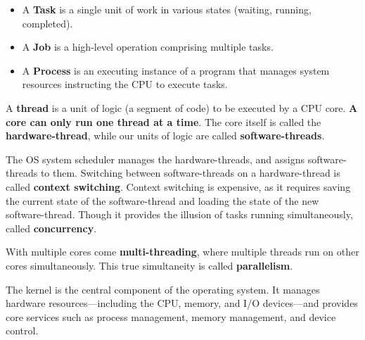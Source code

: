 \begin{Def}

    \begin{itemize}
        \item A \textbf{Task} is a single unit of work in various states (waiting, running, completed).
        \item A \textbf{Job} is a high-level operation comprising multiple tasks.
        \item A \textbf{Process} is an executing instance of a program that manages system resources instructing the CPU to execute tasks.
    \end{itemize}
\end{Def}

\newpage
\begin{Def}

    A \textbf{thread} is a unit of logic (a segment of code) to be executed by a CPU core. \textbf{A core can only run one thread at a time}.
    The core itself is called the \textbf{hardware-thread}, while our units of logic are called \textbf{software-threads}.

    The OS system scheduler manages the hardware-threads, and assigns software-threads to them. Switching between software-threads on a hardware-thread is called \textbf{context switching}.
    Context switching is expensive, as it requires saving the current state of the software-thread and loading the state of the new software-thread. Though it provides the illusion of tasks running simultaneously, 
    called \textbf{concurrency}.
    
    With multiple cores come \textbf{multi-threading}, where multiple threads run on other cores simultaneously.
    This true simultaneity is called \textbf{parallelism}.
\end{Def}
    
\vspace{-.5em}
\begin{Def}[Kernel]
    
    The kernel is the central component of the operating system. It manages hardware resources—including the CPU, memory, and I/O devices—and provides core services such as process management, memory management, and device control.
\end{Def}

